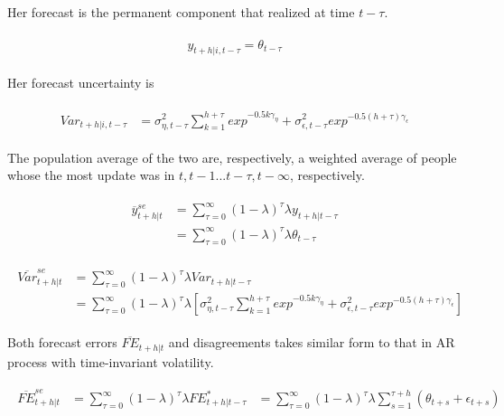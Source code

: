 \documentclass[12pt]{article}
\begin{document}
	Her forecast is the permanent component that realized at time $t-\tau$. 
	
	\begin{eqnarray}
	\begin{split}
	y_{t+h|i,t-\tau}  = \theta_{t-\tau} 
	\end{split}
	\end{eqnarray}
	
	Her forecast uncertainty is 
	

	\begin{eqnarray}
	\begin{split}
	Var_{t+h|i,t-\tau} & = \sigma^2_{\eta,t-\tau} \sum^{h+\tau}_{k=1} exp^{- 0.5k\gamma_{\eta}} +  \sigma^2_{\epsilon,t-\tau} exp^{- 0.5(h+\tau)\gamma_{\epsilon}}
	\end{split} 
	\end{eqnarray}
	
	The population average of the two are, respectively, a weighted average of people whose the most update was in $t, t-1... t-\tau, t-\infty$, respectively. 
	
	
	\begin{eqnarray}
	\begin{split}
	\overline y^{se}_{t+h|t} & = \sum^{\infty}_{\tau=0} (1-\lambda)^\tau\lambda y_{t+h|t-\tau} \\
	& = \sum^{\infty}_{\tau=0} (1-\lambda)^\tau\lambda \theta_{t-\tau}
	\end{split} 
	\end{eqnarray}
	
	\begin{eqnarray}
	\begin{split}
	\overline {Var}^{se}_{t+h|t} & = \sum^{\infty}_{\tau=0} (1-\lambda)^\tau\lambda Var_{t+h|t-\tau} \\
	& = \sum^{\infty}_{\tau=0} (1-\lambda)^\tau\lambda [ \sigma^2_{\eta,t-\tau} \sum^{h+\tau}_{k=1} exp^{- 0.5k\gamma_{\eta}} +  \sigma^2_{\epsilon,t-\tau} exp^{- 0.5(h+\tau)\gamma_{\epsilon}}]
	\end{split} 
	\end{eqnarray}
	
	Both forecast errors $\overline{FE}_{t+h|t}$ and disagreements takes similar form to that in AR process with time-invariant volatility. 
	
	
	\begin{eqnarray}
	\begin{split}
	\overline {FE}^{se}_{t+h|t} & = \sum^{\infty}_{\tau=0} (1-\lambda)^\tau\lambda {FE}^*_{t+h|t-\tau} 
	& = \sum^{\infty}_{\tau=0} (1-\lambda)^\tau\lambda \sum^{\tau+h}_{s=1} (\theta_{t+s} + \epsilon_{t+s})  
	\end{split} 
	\end{eqnarray}
	
\end{document}
